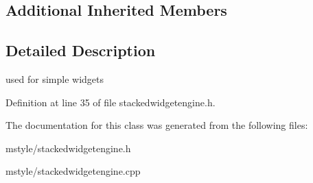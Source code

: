 \subsection*{Additional Inherited Members}


\subsection{Detailed Description}
used for simple widgets 

Definition at line 35 of file stackedwidgetengine.\+h.



The documentation for this class was generated from the following files\+:\begin{DoxyCompactItemize}
\item 
mstyle/stackedwidgetengine.\+h\item 
mstyle/stackedwidgetengine.\+cpp\end{DoxyCompactItemize}
